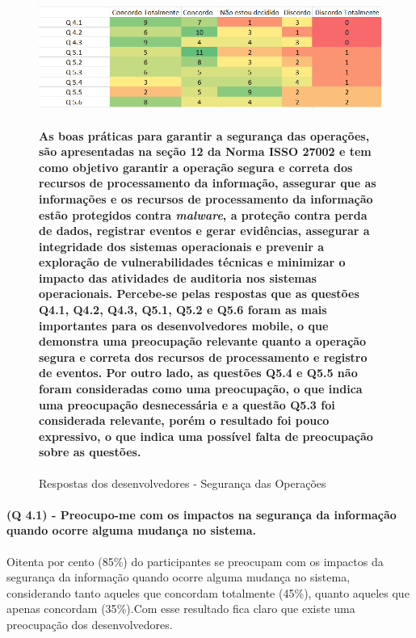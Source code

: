 \begin{figure}[H]
\includegraphics[scale=0.7]{fig/Mapa de calor 3.PNG}
\caption{Respostas dos desenvolvedores - Segurança das Operações }
\label{fig:3}
\paragraph{As boas práticas para garantir a segurança das operações, são apresentadas na seção 12 da Norma ISSO 27002 e tem como objetivo garantir a operação segura e correta dos recursos de processamento da informação, assegurar que as informações e os recursos de processamento da informação estão protegidos contra \textit{malware}, a proteção contra perda de dados, registrar eventos e gerar evidências, assegurar a integridade dos sistemas operacionais e prevenir a exploração de vulnerabilidades técnicas e minimizar o impacto das atividades de auditoria nos sistemas operacionais. Percebe-se pelas respostas que as questões Q4.1, Q4.2, Q4.3, Q5.1, Q5.2 e Q5.6 foram as mais importantes para os desenvolvedores mobile, o que demonstra uma preocupação relevante quanto a operação segura e correta dos recursos de processamento e registro de eventos. Por outro lado, as questões  Q5.4 e Q5.5 não foram consideradas como uma preocupação, o que indica uma preocupação desnecessária e a questão Q5.3 foi considerada relevante, porém o resultado foi pouco expressivo, o que indica uma possível falta de preocupação sobre as questões.}
\end{figure}

\paragraph{\textbf{(Q 4.1)} - Preocupo-me com os impactos na segurança da informação quando ocorre alguma mudança no sistema.}

Oitenta por cento (85{\%}) do participantes se preocupam com os impactos da segurança da informação quando ocorre alguma mudança no sistema, considerando tanto aqueles que concordam totalmente (45{\%}), quanto aqueles que apenas concordam (35{\%}).Com esse resultado fica claro que existe uma preocupação dos desenvolvedores.

